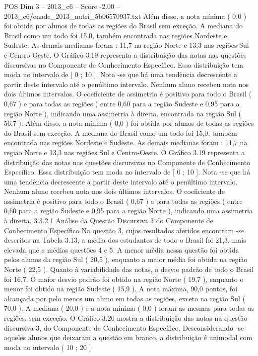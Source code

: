 \begin{textsample}{POS Dim 3 – 2013\_c6 – Score -2.00 – 2013\_c6/enade\_2013\_nutri\_5b06570937.txt}
Além disso, a nota mínima ( 0,0 ) foi obtida por alunos de todas as regiões do Brasil sem exceção.
A mediana do Brasil como um todo foi 15,0, também encontrada nas regiões Nordeste e Sudeste.
As demais medianas foram : 11,7 na região Norte e 13,3 nas regiões Sul e Centro-Oeste.
O Gráfico 3.19 representa a distribuição das notas nas questões discursivas no Componente de Conhecimento Específico.
Essa distribuição tem moda no intervalo de [ 0 ; 10 ].
Nota -se que há uma tendência decrescente a partir deste intervalo até o penúltimo intervalo.
Nenhum aluno recebeu nota nos dois últimos intervalos.
O coeficiente de assimetria é positivo para todo o Brasil ( 0,67 ) e para todas as regiões ( entre 0,60 para a região Sudeste e 0,95 para a região Norte ), indicando uma assimetria à direita. encontrada na região Sul ( 56,7 ).
Além disso, a nota mínima ( 0,0 ) foi obtida por alunos de todas as regiões do Brasil sem exceção.
A mediana do Brasil como um todo foi 15,0, também encontrada nas regiões Nordeste e Sudeste.
As demais medianas foram : 11,7 na região Norte e 13,3 nas regiões Sul e Centro-Oeste.
O Gráfico 3.19 representa a distribuição das notas nas questões discursivas no Componente de Conhecimento Específico.
Essa distribuição tem moda no intervalo de [ 0 ; 10 ].
Nota -se que há uma tendência decrescente a partir deste intervalo até o penúltimo intervalo.
Nenhum aluno recebeu nota nos dois últimos intervalos.
O coeficiente de assimetria é positivo para todo o Brasil ( 0,67 ) e para todas as regiões ( entre 0,60 para a região Sudeste e 0,95 para a região Norte ), indicando uma assimetria à direita. 3.3.2.1 Análise da Questão Discursiva 3 do Componente de Conhecimento Específico Na questão 3, cujos resultados aferidos encontram -se descritos na Tabela 3.13, a média dos estudantes de todo o Brasil foi 21,3, mais elevada que a médias questões 4 e 5.
A menor média nessa questão foi obtida pelos alunos da região Sul ( 20,5 ), enquanto a maior média foi obtida na região Norte ( 22,5 ).
Quanto à variabilidade das notas, o desvio padrão de todo o Brasil foi 16,7.
O maior desvio padrão foi obtido na região Norte ( 19,7 ), enquanto o menor foi obtido na região Sudeste ( 15,9 ).
A nota máxima, 90,0 pontos, foi alcançada por pelo menos um aluno em todas as regiões, exceto na região Sul ( 70,0 ).
A mediana ( 20,0 ) e a nota mínima ( 0,0 ) foram as mesmas para todas as regiões, sem exceção.
O Gráfico 3.20 mostra a distribuição das notas na questão discursiva 3, do Componente de Conhecimento Específico.
Desconsiderando -se aqueles alunos que deixaram a questão em branco, a distribuição é unimodal com moda no intervalo ( 10 ; 20 ].

\end{textsample}
